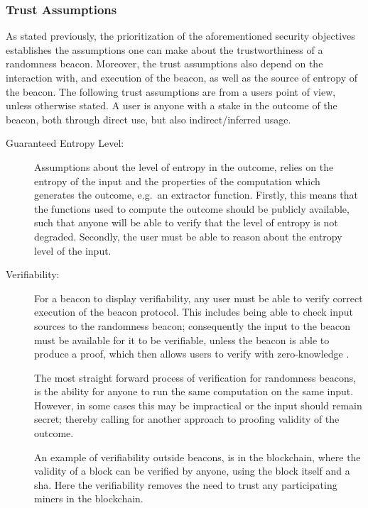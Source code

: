 \subsubsection{Trust Assumptions}\label{ssub:trust_assumptions}
As stated previously, the prioritization of the aforementioned security objectives establishes the assumptions one can make about the trustworthiness of a randomness beacon.
Moreover, the trust assumptions also depend on the interaction with, and execution of the beacon, as well as the source of entropy of the beacon.
The following trust assumptions are from a users point of view, unless otherwise stated.
A user is anyone with a stake in the outcome of the beacon, both through direct use, but also indirect/inferred usage.
\begin{description}

    \item [Guaranteed Entropy Level:]
        Assumptions about the level of entropy in the outcome, relies on the entropy of the input and the properties of the computation which generates the outcome, e.g.\ an extractor function.
        Firstly, this means that the functions used to compute the outcome should be publicly available, such that anyone will be able to verify that the level of entropy is not degraded.
        Secondly, the user must be able to reason about the entropy level of the input.

    \item [Verifiability:]
        For a beacon to display verifiability, any user must be able to verify correct execution of the beacon protocol.
        This includes being able to check input sources to the randomness beacon;
        consequently the input to the beacon must be available for it to be verifiable, unless the beacon is able to produce a proof, which then allows users to verify with zero-knowledge .

        The most straight forward process of verification for randomness beacons, is the ability for anyone to run the same computation on the same input.
        However, in some cases this may be impractical or the input should remain secret; thereby calling for another approach to proofing validity of the outcome.

        An example of verifiability outside beacons, is in the blockchain, where the validity of a block can be verified by anyone, using the block itself and a \acrfull{sha}.
        Here the verifiability removes the need to trust any participating miners in the blockchain.


\end{description}
